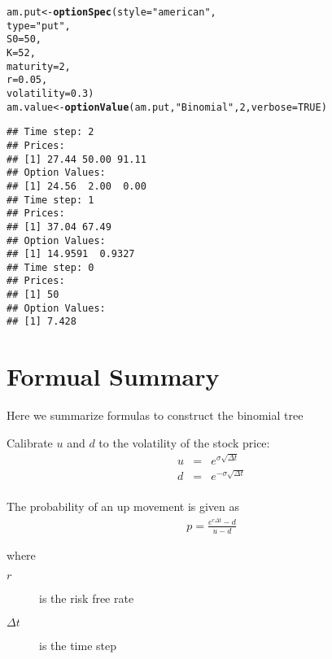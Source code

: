 \documentclass{article}\usepackage[]{graphicx}\usepackage[]{color}
\makeatletter
\newcommand{\hlstr}[1]{\textcolor[rgb]{0.192,0.494,0.8}{#1}}%
\newcommand{\hlkwd}[1]{\textcolor[rgb]{0.737,0.353,0.396}{\textbf{#1}}}%
\newenvironment{kframe}{%
 \def\at@end@of@kframe{}%
 \ifinner\ifhmode%
  \def\at@end@of@kframe{\end{minipage}}%
  \begin{minipage}{\columnwidth}%
 \fi\fi%
 \def\FrameCommand##1{\hskip\@totalleftmargin \hskip-\fboxsep
 \colorbox{shadecolor}{##1}\hskip-\fboxsep
     \hskip-\linewidth \hskip-\@totalleftmargin \hskip\columnwidth}%
 \MakeFramed {\advance\hsize-\width
   \@totalleftmargin\z@ \linewidth\hsize
   \@setminipage}}%
 {\par\unskip\endMakeFramed%
 \at@end@of@kframe}
\newenvironment{knitrout}{}{} %
\makeatother
\begin{document}
\begin{knitrout}
\color{fgcolor}\begin{kframe}
\begin{alltt}
am.put <- \hlkwd{optionSpec}(style = \hlstr{"american"}, 
                      type = \hlstr{"put"}, 
                      S0 = 50, 
                      K = 52, 
                      maturity = 2, 
                      r = 0.05, 
                      volatility = 0.3)
am.value <- \hlkwd{optionValue}(am.put, \hlstr{"Binomial"}, 2, verbose = TRUE)
\end{alltt}
\begin{verbatim}
## Time step: 2
## Prices:
## [1] 27.44 50.00 91.11
## Option Values:
## [1] 24.56  2.00  0.00
## Time step: 1
## Prices:
## [1] 37.04 67.49
## Option Values:
## [1] 14.9591  0.9327
## Time step: 0
## Prices:
## [1] 50
## Option Values:
## [1] 7.428
\end{verbatim}
\end{kframe}
\end{knitrout}


\section{Formual Summary}
Here we summarize formulas to construct the binomial tree

Calibrate $u$ and $d$ to the volatility of the stock price:
\begin{eqnarray*}
u &=& e^{\sigma \sqrt{\Delta t}}\\
d &=& e^{-\sigma \sqrt{\Delta t}}\\
\end{eqnarray*}

The probability of an up movement is given as
\begin{eqnarray*}
p = \frac{e^{r \Delta t} - d}{u - d}
\end{eqnarray*}

where
\begin{description}
  \item[$r$] is the risk free rate
  \item[$\Delta t$] is the time step
\end{description}
\end{document}
